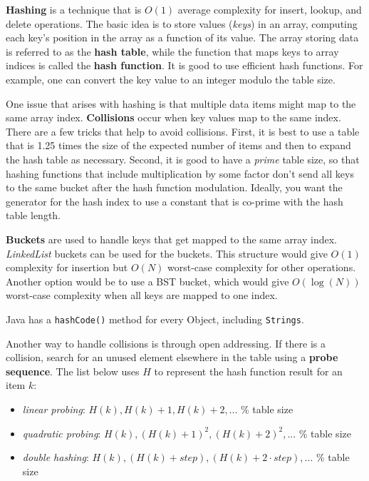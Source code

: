 \textbf{Hashing} is a technique that is $O(1)$ average complexity for insert, lookup, and delete operations. The basic idea is to store values (\textit{keys}) in an array, computing each key's position in the array as a function of its value. The array storing data is referred to as the \textbf{hash table}, while the function that maps keys to array indices is called the \textbf{hash function}. It is good to use efficient hash functions. For example, one can convert the key value to an integer modulo the table size. 

One issue that arises with hashing is that multiple data items might map to the same array index. \textbf{Collisions} occur when key values map to the same index. There are a few tricks that help to avoid collisions. First, it is best to use a table that is 1.25 times the size of the expected number of items and then to expand the hash table as necessary. Second, it is good to have a \textit{prime} table size, so that hashing functions that include multiplication by some factor don't send all keys to the same bucket after the hash function modulation. Ideally, you want the generator for the hash index to use a constant that is co-prime with the hash table length. 

\textbf{Buckets} are used to handle keys that get mapped to the same array index. \textit{LinkedList} buckets can be used for the buckets. This structure would give $O(1)$ complexity for insertion but $O(N)$ worst-case complexity for other operations. Another option would be to use a BST bucket, which would give $O(\log(N))$ worst-case complexity when all keys are mapped to one index.

Java has a \texttt{hashCode()} method for every Object, including \texttt{Strings}. 

Another way to handle collisions is through open addressing. If there is a collision, search for an unused element elsewhere in the table using a \textbf{probe sequence}. The list below uses $H$ to represent the hash function result for an item $k$:

\begin{itemize}
	\item \textit{linear probing}: $H(k), H(k)+1, H(k)+2, ...$ \% table size
	\item \textit{quadratic probing}: $H(k), (H(k)+1)^{2}, (H(k)+2)^{2}, ...$ \% table size
	\item \textit{double hashing}: $H(k), (H(k)+step), (H(k)+2\cdot step), ...$ \% table size
\end{itemize}

